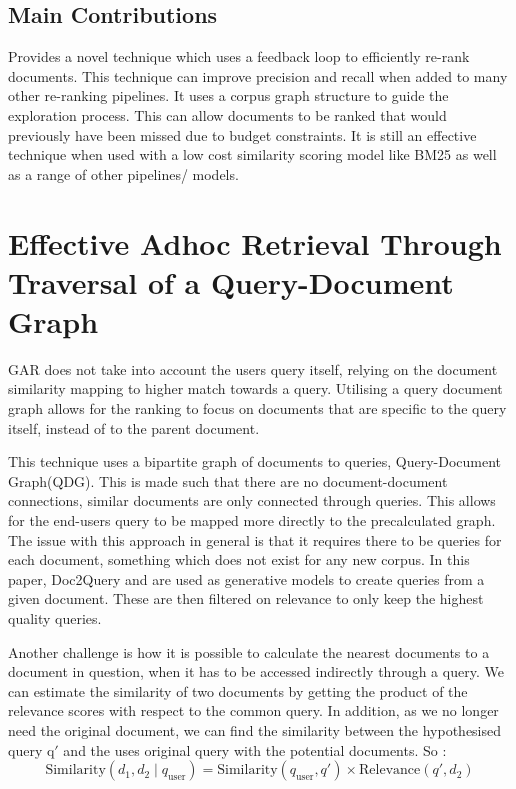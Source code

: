 \documentclass[sigconf,authorversion,nonacm]{acmart}
\begin{document}
\subsection{Main Contributions}

Provides a novel technique which uses a feedback loop to efficiently re-rank documents. This
technique can improve precision and recall when added to many other re-ranking pipelines. It uses a
corpus graph structure to guide the exploration process. This can allow documents to be ranked that
would previously have been missed due to budget constraints. It is still an effective technique when
used with a low cost similarity scoring model like BM25 as well as a range of other pipelines/
models.

\section{Effective Adhoc Retrieval Through Traversal of a Query-Document Graph}

GAR\cite{gar} does not take into account the users query itself, relying on the document similarity mapping to
higher match towards a query. Utilising a query document graph allows for the ranking to focus on
documents that are specific to the query itself, instead of to the parent document.

This technique uses a bipartite graph of documents to queries, Query-Document
Graph(QDG)\cite{query-document}. This is made such that there are no document-document connections,
similar documents are only connected through queries. This allows for the end-users query to be
mapped more directly to the precalculated graph. The issue with this approach in general is that it
requires there to be queries for each document, something which does not exist for any new corpus.
In this paper, Doc2Query\cite{doc2query} and are used as generative models to create queries from a given document.
These are then filtered on relevance to only keep the highest quality queries.

Another challenge is how it is possible to calculate the nearest documents to a document in
question, when it has to be accessed indirectly through a query. We can estimate the similarity
of two documents by getting the product of the relevance scores with respect to the common query. In
addition, as we no longer need the original document, we can find the similarity between the
hypothesised query q\('\) and the uses original query with the potential documents.
So :
\[
	\text{Similarity}(d_1, d_2 \mid q_{\text{user}}) = \text{Similarity}(q_{\text{user}}, q') \times
	\text{Relevance}(q', d_2)
\]
\end{document}
